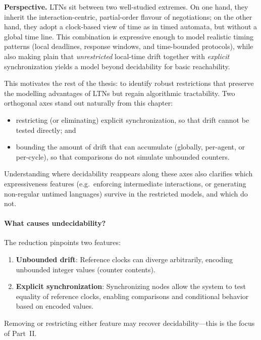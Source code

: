 \smallskip
\noindent\textbf{Perspective.}
LTNs sit between two well-studied extremes.  On one hand, they inherit the
interaction-centric, partial-order flavour of negotiations; on the other hand,
they adopt a clock-based view of time as in timed automata, but without a global
time line.  This combination is expressive enough to model realistic timing
patterns (local deadlines, response windows, and time-bounded protocols), while
also making plain that \emph{unrestricted} local-time drift together with
\emph{explicit} synchronization yields a model beyond decidability for basic
reachability.

This motivates the rest of the thesis: to identify robust restrictions that
preserve the modelling advantages of LTNs but regain algorithmic tractability.
Two orthogonal axes stand out naturally from this chapter:
\begin{itemize}
  \item restricting (or eliminating) explicit synchronization, so that drift cannot
        be tested directly; and
  \item bounding the amount of drift that can accumulate (globally, per-agent, or
        per-cycle), so that comparisons do not simulate unbounded counters.
\end{itemize}
Understanding where decidability reappears along these axes also clarifies which
expressiveness features (e.g.\ enforcing intermediate interactions, or generating
non-regular untimed languages) survive in the restricted models, and which do not.

\smallskip
\paragraph{What causes undecidability?} The reduction pinpoints two features:
\begin{enumerate}
\item \textbf{Unbounded drift}: Reference clocks can diverge arbitrarily, encoding unbounded integer values (counter contents).
\item \textbf{Explicit synchronization}: Synchronizing nodes allow the system to test equality of reference clocks, enabling comparisons and conditional behavior based on encoded values.
\end{enumerate}

Removing or restricting either feature may recover decidability—this is the focus of Part~II.

